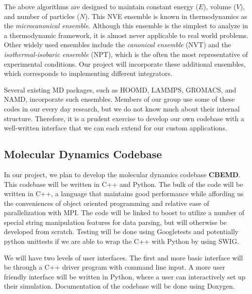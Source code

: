 \documentclass[10pt]{article}
\begin{document}
The above algorithms are designed to maintain constant energy ($E$), volume ($V$), and number of particles ($N$).  This NVE ensemble is known in thermodynamics as the {\em microcanonical ensemble}.
Although this ensemble is the simplest to analyze in a thermodynamic framework, it is almost never applicable to real world problems.
Other widely used ensembles include the {\em canonical ensemble} (NVT) and the {\em isothermal-isobaric ensemble} (NPT), which is the often the most representative of experimental conditions.
Our project will incorporate these additional ensembles, which corresponds to implementing different integrators.

Several existing MD packages, such as HOOMD, LAMMPS, GROMACS, and NAMD, incorporate such ensembles. Members of our group use some of these codes in our every day research, but we do not know much about their internal structure. Therefore, it is a prudent exercise to develop our own codebase with a well-written interface that we can each extend for our custom applications.

\subsection{Molecular Dynamics Codebase}
In our project, we plan to develop the molecular dynamics codebase \textbf{CBEMD}. This codebase will be written in C++ and Python. The bulk of the code will be written in C++, a language that maintains good performance while affording us the conveniences of object oriented programming and relative ease of parallelization with MPI. The code will be linked to boost to utilize a number of special string manipulation features for data parsing, but will otherwise be developed from scratch. Testing will be done using Googletests and potentially python unittests if we are able to wrap the C++ with Python by using SWIG.

We will have two levels of user interfaces.  The first and more basic interface will be through a C++ driver program with command line input.  A more user friendly interface will be written in Python, where a user can interactively set up their simulation. Documentation of the codebase will be done using Doxygen.

\end{document}
